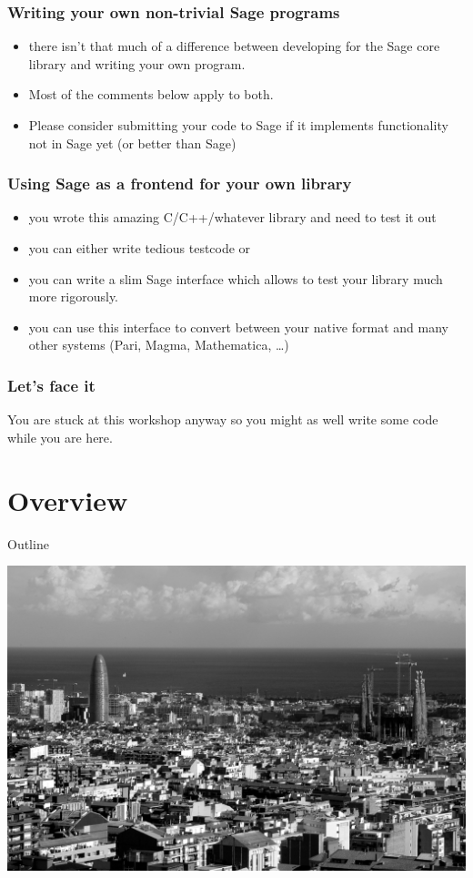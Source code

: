 \documentclass[11pt,blackandwhite]{beamer}
\begin{document}
\begin{frame}
\frametitle{Writing your own non-trivial Sage programs} 
\begin{itemize}
 \item there isn't that much of a difference between developing for the Sage
core library and writing your own program.
 \item Most of the comments below apply to both.
 \item Please consider submitting your code to Sage if it implements
functionality not in Sage yet (or better than Sage)
\end{itemize}

\end{frame}


\begin{frame}
\frametitle{Using Sage as a frontend for your own library}
\begin{itemize}
 \item you wrote this amazing C/C++/whatever library and need to test it out
 \item you can either write tedious testcode or
 \item you can write a slim Sage interface which allows to test your library
much more rigorously.
 \item you can use this interface to convert between your native format and
many other systems (Pari, Magma, Mathematica, \dots)
\end{itemize}
\end{frame}

\begin{frame}
\frametitle{Let's face it} 

\begin{center}
You are stuck at this workshop anyway so you might as well write
some code while you are here. 
\end{center}


\end{frame}

\section{Overview}

\begin{frame}{Outline}
\tableofcontents[sectionstyle=show/shaded]
\begin{flushright}
\includegraphics[height=0.3\textwidth]{overview.jpg}
\end{flushright}
\end{frame}
\end{document}
